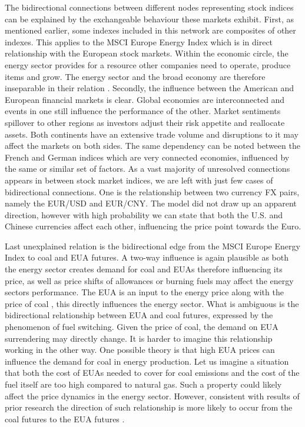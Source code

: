 \documentclass[12pt, letterpaper]{article}
\begin{document}
The bidirectional connections between different nodes representing stock indices can be explained by the exchangeable behaviour these markets exhibit. First, as mentioned earlier, some indexes included in this network are composites of other indexes. This applies to the MSCI Europe Energy Index which is in direct relationship with the European stock markets. Within the economic circle, the energy sector provides for a resource other companies need to operate, produce items and grow. The energy sector and the broad economy are therefore inseparable in their relation \parencite{tan2017}. Secondly, the influence between the American and European financial markets is clear. Global economies are interconnected and events in one still influence the performance of the other. Market sentiments spillover to other regions as investors adjust their risk appetite and reallocate assets. Both continents have an extensive trade volume and disruptions to it may affect the markets on both sides. The same dependency can be noted between the French and German indices which are very connected economies, influenced by the same or similar set of factors. As a vast majority of unresolved connections appears in between stock market indices, we are left with just few cases of bidirectional connections. One is the relationship between two currency FX pairs, namely the EUR/USD and EUR/CNY. The model did not draw up an apparent direction, however with high probability we can state that both the U.S. and Chinese currencies affect each other, influencing the price point towards the Euro.

Last unexplained relation is the bidirectional edge from the MSCI Europe Energy Index to coal and EUA futures. A two-way influence is again plausible as both the energy sector creates demand for coal and EUAs therefore influencing its price, as well as price shifts of allowances or burning fuels may affect the energy sectors performance. The EUA is an input to the energy price along with the price of coal \parencite{lovcha2021}, this directly influences the energy sector. What is ambiguous is the bidirectional relationship between EUA and coal futures, expressed by the phenomenon of fuel switching. Given the price of coal, the demand on EUA surrendering may directly change. It is harder to imagine this relationship working in the other way. One possible theory is that high EUA prices can influence the demand for coal in energy production. Let us imagine a situation that both the cost of EUAs needed to cover for coal emissions and the cost of the fuel itself are too high compared to natural gas. Such a property could likely affect the price dynamics in the energy sector. However, consistent with results of prior research the direction of such relationship is more likely to occur from the coal futures to the EUA futures \parencite{lovcha2021, tan2017}.
\end{document}

